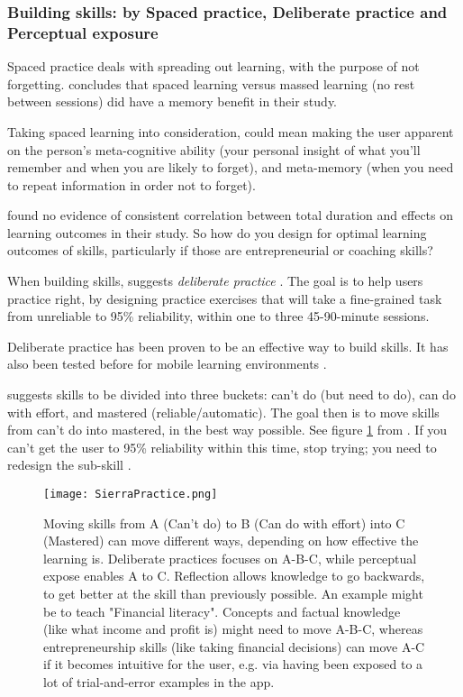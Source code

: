   \subsubsection{Building skills: by Spaced practice, Deliberate practice and Perceptual exposure}

  Spaced practice deals with spreading out learning, with the purpose of not forgetting. \cite{gates} concludes that spaced learning versus massed learning (no rest between sessions) did have a memory benefit in their study.

  Taking spaced learning into consideration, could mean making the user apparent on the person's meta-cognitive ability (your personal insight of what you'll remember and when you are likely to forget), and meta-memory (when you need to repeat information in order not to forget).

  \cite{gates} found no evidence of consistent correlation between total duration and effects on learning outcomes in their study. So how do you design for optimal learning outcomes of skills, particularly if those are entrepreneurial or coaching skills?

  When building skills, \cite{sierra} suggests \textit{deliberate practice} \citep{yengin}. The goal is to help users practice right, by designing practice exercises that will take a fine-grained task from unreliable to 95\% reliability, within one to three 45-90-minute sessions.

  Deliberate practice has been proven to be an effective way to build skills. It has also been tested before for mobile learning environments \citep{yengin}.

  \cite{sierra} suggests skills to be divided into three buckets: can't do (but need to do), can do with effort, and mastered (reliable/automatic). The goal then is to move skills from can't do into mastered, in the best way possible. See figure \ref{fig:sierra-practice} from \cite{sierra}. If you can’t get the user to 95\% reliability within this time, stop trying; you need to redesign the sub-skill \citep{sierra}.

  \begin{figure}[h]
    \centering
    \texttt{[image: SierraPractice.png]}
    \caption{Moving skills from A (Can't do) to B (Can do with effort) into C (Mastered) can move different ways, depending on how effective the learning is. Deliberate practices focuses on A-B-C, while perceptual expose enables A to C. Reflection allows knowledge to go backwards, to get better at the skill than previously possible. An example might be to teach "Financial literacy". Concepts and factual knowledge (like what income and profit is) might need to move A-B-C, whereas entrepreneurship skills (like taking financial decisions) can move A-C if it becomes intuitive for the user, e.g. via having been exposed to a lot of trial-and-error examples in the app.}
    \label{fig:sierra-practice}
  \end{figure}

